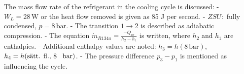 The mass flow rate of the refrigerant in the cooling cycle is discussed:  
- \( W_L = 28 \, \text{W} \) or the heat flow removed is given as 85 J per second.  
- \( ZSU: \) fully condensed, \( p = 8 \, \text{bar} \).  
- The transition \( 1 \to 2 \) is described as adiabatic compression.  
- The equation \( \dot{m}_{R134a} = \frac{-Q_{as}}{h_2 - h_1} \) is written, where \( h_2 \) and \( h_1 \) are enthalpies.  
- Additional enthalpy values are noted:  
  \( h_3 = h(8 \, \text{bar}) \),  
  \( h_4 = h(\text{sätt. fl., 8 \, \text{bar}}) \).  
- The pressure difference \( p_3 - p_1 \) is mentioned as influencing the cycle.